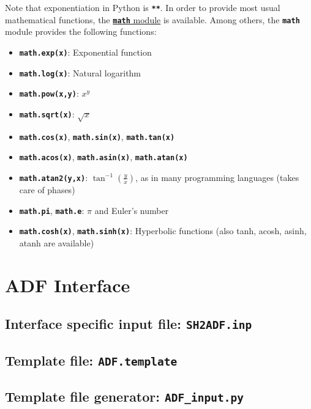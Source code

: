 \documentclass[a4paper,11pt,DIV=15,openany,twoside=false]{scrbook}
\newcommand{\ttt}[1]{\textbf{\texttt{#1}}}
\begin{document}
Note that exponentiation in Python is \ttt{**}. In order to provide most usual mathematical functions, the \href{https://docs.python.org/2/library/math.html}{\ttt{math} module} is available. Among others, the \ttt{math} module provides the following functions:
\begin{itemize}
  \item \ttt{math.exp(x)}: Exponential function
  \item \ttt{math.log(x)}: Natural logarithm
  \item \ttt{math.pow(x,y)}: $x^y$
  \item \ttt{math.sqrt(x)}: $\sqrt{x}$
  \item \ttt{math.cos(x)}, \ttt{math.sin(x)}, \ttt{math.tan(x)}
  \item \ttt{math.acos(x)}, \ttt{math.asin(x)}, \ttt{math.atan(x)}
  \item \ttt{math.atan2(y,x)}: $\tan^{-1}\left(\frac{y}{x}\right)$, as in many programming languages (takes care of phases)
  \item \ttt{math.pi}, \ttt{math.e}: $\pi$ and Euler's number
  \item \ttt{math.cosh(x)}, \ttt{math.sinh(x)}: Hyperbolic functions (also tanh, acosh, asinh, atanh are available)
\end{itemize}




\section{ADF Interface}\label{sec:int:adf}

\subsection{Interface specific input file: \ttt{SH2ADF.inp}}

\subsection{Template file: \ttt{ADF.template}}

\subsection{Template file generator: \ttt{ADF\_input.py}}\label{sec:adf_input.py}
\end{document}
